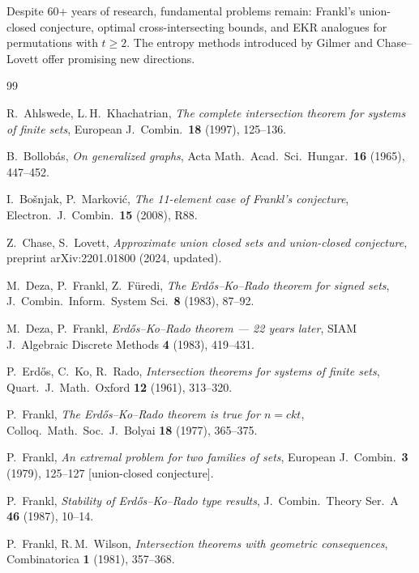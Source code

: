 \documentclass[12pt,a4paper]{amsart}
\theoremstyle{definition}
\theoremstyle{remark}
\begin{document}
Despite 60+ years of research, fundamental problems remain: Frankl's union-closed
conjecture, optimal cross-intersecting bounds, and EKR analogues for permutations
with $t \geq 2$. The entropy methods introduced by Gilmer and Chase--Lovett offer
promising new directions.

\begin{thebibliography}{99}

R.~Ahlswede, L.\,H.~Khachatrian,
\textit{The complete intersection theorem for systems of finite sets},
European J.\ Combin.\ \textbf{18} (1997), 125--136.

B.~Bollobás,
\textit{On generalized graphs},
Acta Math.\ Acad.\ Sci.\ Hungar.\ \textbf{16} (1965), 447--452.

I.~Bošnjak, P.~Marković,
\textit{The 11-element case of Frankl's conjecture},
Electron.\ J.\ Combin.\ \textbf{15} (2008), R88.

Z.~Chase, S.~Lovett,
\textit{Approximate union closed sets and union-closed conjecture},
preprint arXiv:2201.01800 (2024, updated).

M.~Deza, P.~Frankl, Z.~Füredi,
\textit{The Erdős--Ko--Rado theorem for signed sets},
J.\ Combin.\ Inform.\ System Sci.\ \textbf{8} (1983), 87--92.

M.~Deza, P.~Frankl,
\textit{Erdős--Ko--Rado theorem --- 22 years later},
SIAM J.\ Algebraic Discrete Methods \textbf{4} (1983), 419--431.

P.~Erd\H{o}s, C.~Ko, R.~Rado,
\textit{Intersection theorems for systems of finite sets},
Quart.\ J.\ Math.\ Oxford \textbf{12} (1961), 313--320.

P.~Frankl,
\textit{The Erdős--Ko--Rado theorem is true for $n = ckt$},
Colloq.\ Math.\ Soc.\ J.\ Bolyai \textbf{18} (1977), 365--375.

P.~Frankl,
\textit{An extremal problem for two families of sets},
European J.\ Combin.\ \textbf{3} (1979), 125--127 [union-closed conjecture].

P.~Frankl,
\textit{Stability of Erdős--Ko--Rado type results},
J.\ Combin.\ Theory Ser.\ A \textbf{46} (1987), 10--14.

P.~Frankl, R.\,M.~Wilson,
\textit{Intersection theorems with geometric consequences},
Combinatorica \textbf{1} (1981), 357--368.


\end{thebibliography}
\end{document}
